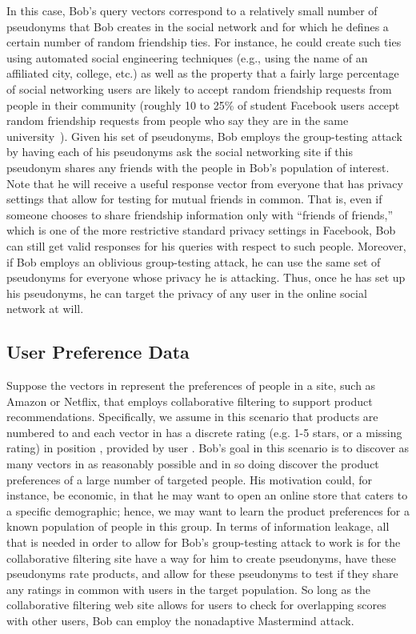 \documentclass{article}
\begin{document}
In this case, Bob's query vectors correspond to a relatively small
number of pseudonyms that Bob creates in the
social network and for which he defines a certain number of random friendship ties.
For instance, he could create such ties using automated social
engineering techniques (e.g., using the name of an affiliated city,
college, etc.) as well as the property that 
a fairly large percentage of social networking users are likely to accept
random friendship requests from people in their community 
(roughly 10 to 25\% of student Facebook 
users accept random friendship requests from people who say they are
in the same university~\cite{st-snf-07}).
Given his set of pseudonyms, Bob employs the group-testing
attack by having each of his pseudonyms ask the social networking site 
if this pseudonym shares any friends with the people in Bob's
population of interest.
Note that he will receive a useful response vector from everyone that
has privacy settings that allow for testing for mutual friends in
common.
That is, even if someone chooses to share friendship
information only with ``friends of friends,'' which is one of the more
restrictive standard privacy settings in Facebook, Bob can still get
valid responses for his queries with respect to such people.
Moreover, if Bob employs an oblivious group-testing attack, he can
use the same set of pseudonyms for everyone whose privacy he is
attacking.
Thus, once he has set up his pseudonyms, he can target 
the privacy of any user in
the online social network at will.

\subsection{User Preference Data}
Suppose the vectors in  represent the preferences of people
in a site, such as Amazon or Netflix,
that employs collaborative filtering to support product recommendations.
Specifically, we assume in this scenario that products are numbered
 to  and each vector  in  has a discrete rating (e.g. 1-5 stars, 
or a missing rating) in position , provided by user .
Bob's goal in this scenario is to discover as many vectors in  as 
reasonably possible and in 
so doing discover the product preferences of a large number of
targeted people.
His motivation could, for instance, be economic, in that he may want
to open an online store that caters to
a specific demographic; hence, we may want to learn the product preferences for
a known population of people in this group.
In terms of information leakage, all that is needed in order to allow
for Bob's group-testing attack to work is for the collaborative
filtering site have a way for him to create pseudonyms, have these
pseudonyms rate products, and allow for these pseudonyms to test if 
they share any ratings in common with users in the target
population.
So long as the collaborative filtering web site allows for users to
check for overlapping scores with other users, Bob can employ the
nonadaptive Mastermind attack.
\end{document}
